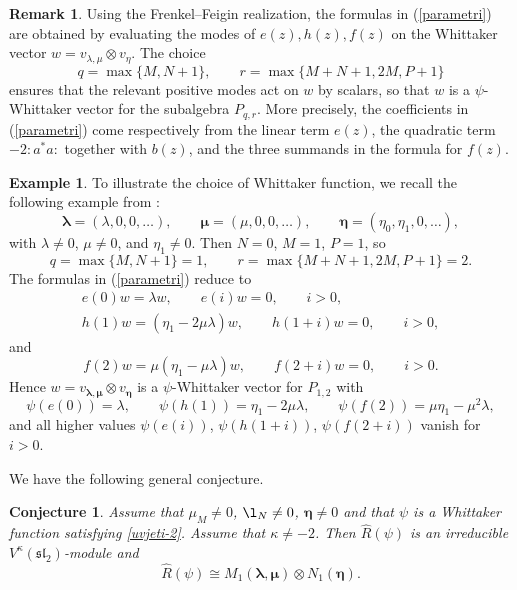 \documentclass[10pt,a4paper]{amsart}
\numberwithin{equation}{section}
\newtheorem{Conjecture}[Theorem]{Conjecture}
\theoremstyle{definition}
\newtheorem{Example}[Theorem]{Example}
\newtheorem{Remark}[Theorem]{Remark}
\newcommand{\1}{\textbf{1}}
\begin{document}
 \begin{Remark}
 Using the Frenkel--Feigin realization, the formulas in (\ref{parametri})
are obtained by evaluating the modes of
$
e(z), h(z),
f(z)
$
on the Whittaker vector $w=v_{\lambda,\mu}\otimes v_\eta$.
The choice
\[
q=\max\{M,N+1\}, \qquad r=\max\{M+N+1,2M,P+1\}
\]
ensures that the relevant positive modes act on $w$ by scalars, so that $w$ is a
$\psi$-Whittaker vector for the subalgebra $P_{q,r}$.
More precisely, the coefficients in (\ref{parametri}) come respectively from the linear
term $e(z)$, the quadratic term $-2{:}a^*a{:}$ together with $b(z)$, and the three
summands in the formula for $f(z)$.
 \end{Remark}

\begin{Example} To illustrate the choice of Whittaker function, we recall the following example from \cite[Section~9]{ALZ-16}:
\[
\bm{\lambda}=(\lambda,0,0,\dots), \qquad
\bm{\mu}=(\mu,0,0,\dots), \qquad
\bm{\eta}=(\eta_0,\eta_1,0,\dots),
\]
with $\lambda\neq 0$, $\mu\neq 0$, and $\eta_1\neq 0$. Then
$N=0$, $M=1$, $P=1$,
so
\[
q=\max\{M,N+1\}=1,\qquad r=\max\{M+N+1,2M,P+1\}=2.
\]
The formulas in (\ref{parametri}) reduce to
\begin{gather*}
e(0)w=\lambda w,\qquad e(i)w=0, \qquad i>0,
\\
h(1)w=(\eta_1-2\mu\lambda)w,\qquad h(1+i)w=0, \qquad i>0,
\end{gather*}
and
\[
f(2)w=\mu (\eta_1-\mu \lambda)w,\qquad f(2+i)w=0, \qquad i>0.
\]
Hence $w=v_{\bm{\lambda},\bm{\mu}}\otimes v_{\bm{\eta}}$ is a $\psi$-Whittaker vector for $P_{1,2}$ with
\[
\psi(e(0))=\lambda,\qquad
\psi(h(1))=\eta_1-2\mu\lambda,\qquad
\psi(f(2))=\mu\eta_1-\mu^2\lambda,
\]
and all higher values $\psi(e(i))$, $\psi(h(1+i))$, $\psi(f(2+i))$ vanish for $i>0$.
\end{Example}

 We have the following general conjecture.
 \begin{Conjecture} \label{conj7.3} Assume that $\mu_M\ne 0$, ${\l}_N \ne 0$, $\bm{\eta} \ne 0$ and that $\psi$ is a Whittaker function satisfying \eqref{uvjeti-2}.
 Assume that $\kappa \ne -2$. Then
 $\widehat{R}(\psi)$ is an irreducible $V^{\kappa} (\mathfrak{sl}_2)$-module and
 \[ \widehat{R}(\psi) \cong M_1 (\bm{\lambda}, \bm{\mu}) \otimes N_1 (\bm{\eta}). \]
 \end{Conjecture}
\end{document}
